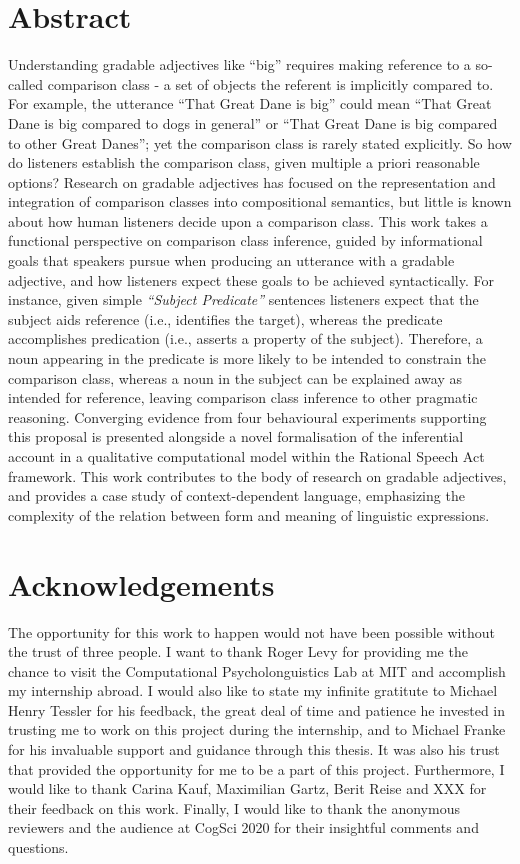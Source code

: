 \documentclass[12pt, twoside, openright]{report}
\begin{document}


\chapter*{Abstract}
Understanding gradable adjectives like “big” requires making reference to a so-called comparison class - a set of objects the referent is implicitly compared to. For example, the utterance “That Great Dane is big” could mean “That Great Dane is big compared to dogs in general” or “That Great Dane is big compared to other Great Danes”; yet the comparison class is rarely stated explicitly. So how do listeners establish the comparison class, given multiple a priori reasonable options?
Research on gradable adjectives has focused on the representation and integration of comparison classes into compositional semantics, but little is known about how human listeners decide upon a comparison class. 
This work takes a functional perspective on comparison class inference, guided by informational goals that speakers pursue when producing an utterance with a gradable adjective, and how listeners expect these goals to be achieved syntactically. For instance, given simple \textit{“Subject Predicate”} sentences listeners expect that the subject aids reference (i.e., identifies the target), whereas the predicate accomplishes predication (i.e., asserts a property of the subject). Therefore, a noun appearing in the predicate is more likely to be intended to constrain the comparison class, whereas a noun in the subject can be explained away as intended for reference, leaving comparison class inference to other pragmatic reasoning. 
Converging evidence from four behavioural experiments supporting this proposal is presented alongside a novel formalisation of the inferential account in a qualitative computational model within the Rational Speech Act framework. This work contributes to the body of research on gradable adjectives, and provides a case study of  context-dependent language, emphasizing the complexity of the relation between form and meaning of linguistic expressions. 


\chapter*{Acknowledgements}

The opportunity for this work to happen would not have been possible without the trust of three people. I want to thank Roger Levy for providing me the chance to visit the Computational Psycholonguistics Lab at MIT and accomplish my internship abroad. I would also like to state my infinite gratitute to Michael Henry Tessler for his feedback, the great deal of time and patience he invested in trusting me to work on this project during the internship, and to Michael Franke for his invaluable support and guidance through this thesis. It was also his trust that provided the opportunity for me to be a part of this project. Furthermore, I would like to thank Carina Kauf, Maximilian Gartz, Berit Reise and XXX for their feedback on this work. Finally, I would like to thank the anonymous reviewers and the audience at CogSci 2020 for their insightful comments and questions. 
\end{document}
